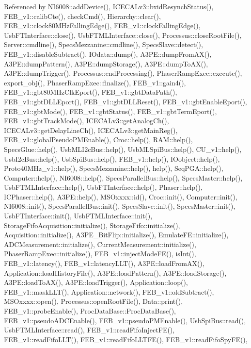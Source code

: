 Referenced by N\+I6008\+::add\+Device(), I\+C\+E\+C\+A\+Lv3\+::bxid\+Resynch\+Status(), F\+E\+B\+\_\+v1\+::calib\+Cte(), check\+Cmd(), Hierarchy\+::clear(), F\+E\+B\+\_\+v1\+::clock80\+M\+Hz\+Falling\+Edge(), F\+E\+B\+\_\+v1\+::clock\+Falling\+Edge(), Usb\+F\+T\+Interface\+::close(), Usb\+F\+T\+M\+L\+Interface\+::close(), Processus\+::close\+Root\+File(), Server\+::cmdline(), Specs\+Mezzanine\+::cmdline(), Specs\+Slave\+::detect(), F\+E\+B\+\_\+v1\+::disable\+Subtract(), I\+Odata\+::dump(), A3\+P\+E\+::dump\+From\+A\+X(), A3\+P\+E\+::dump\+Pattern(), A3\+P\+E\+::dump\+Storage(), A3\+P\+E\+::dump\+To\+A\+X(), A3\+P\+E\+::dump\+Trigger(), Processus\+::end\+Processing(), Phaser\+Ramp\+Exec\+::execute(), export\+\_\+obj(), Phaser\+Ramp\+Exec\+::finalize(), F\+E\+B\+\_\+v1\+::gain4(), F\+E\+B\+\_\+v1\+::gbt80\+M\+Hz\+Clk\+Eport(), F\+E\+B\+\_\+v1\+::gbt\+Data\+Path(), F\+E\+B\+\_\+v1\+::gbt\+D\+L\+L\+Eport(), F\+E\+B\+\_\+v1\+::gbt\+D\+L\+L\+Reset(), F\+E\+B\+\_\+v1\+::gbt\+Enable\+Eport(), F\+E\+B\+\_\+v1\+::gbt\+Mode(), F\+E\+B\+\_\+v1\+::gbt\+Status(), F\+E\+B\+\_\+v1\+::gbt\+Term\+Eport(), F\+E\+B\+\_\+v1\+::gbt\+Track\+Mode(), I\+C\+E\+C\+A\+Lv3\+::get\+Analog\+Ch(), I\+C\+E\+C\+A\+Lv3\+::get\+Delay\+Line\+Ch(), I\+C\+E\+C\+A\+Lv3\+::get\+Main\+Reg(), F\+E\+B\+\_\+v1\+::global\+Pseudo\+P\+M\+Enable(), Croc\+::help(), R\+A\+M\+::help(), Specs\+Glue\+::help(), Usb\+M\+L\+I2c\+Bus\+::help(), Usb\+M\+L\+Spi\+Bus\+::help(), C\+U\+\_\+v1\+::help(), Usb\+I2c\+Bus\+::help(), Usb\+Spi\+Bus\+::help(), F\+E\+B\+\_\+v1\+::help(), I\+Oobject\+::help(), Proto40\+M\+Hz\+\_\+v1\+::help(), Specs\+Mezzanine\+::help(), help(), Seq\+P\+G\+A\+::help(), Computer\+::help(), N\+I6008\+::help(), Specs\+Parallel\+Bus\+::help(), Specs\+Master\+::help(), Usb\+F\+T\+M\+L\+Interface\+::help(), Usb\+F\+T\+Interface\+::help(), Phaser\+::help(), I\+C\+Phaser\+::help(), A3\+P\+E\+::help(), M\+S\+Oxxxx\+::id(), Croc\+::init(), Computer\+::init(), N\+I6008\+::init(), Specs\+Parallel\+Bus\+::init(), Specs\+Slave\+::init(), Specs\+Master\+::init(), Usb\+F\+T\+Interface\+::init(), Usb\+F\+T\+M\+L\+Interface\+::init(), Storage\+Fifo\+Acquisition\+::initialize(), Storage\+Fifo\+::initialize(), Acquisition\+::initialize(), A3\+P\+E\+\_\+\+Bit\+Flip\+::initialize(), Emulate\+F\+E\+::initialize(), A\+D\+C\+Measurement\+::initialize(), Current\+Measurement\+::initialize(), Phaser\+Ramp\+Exec\+::initialize(), F\+E\+B\+\_\+v1\+::inject\+Mode\+F\+E(), is\+Int(), F\+E\+B\+\_\+v1\+::latency(), F\+E\+B\+\_\+v1\+::latency\+L\+L\+T(), A3\+P\+E\+::load\+From\+A\+X(), Application\+::load\+History\+File(), A3\+P\+E\+::load\+Pattern(), A3\+P\+E\+::load\+Storage(), A3\+P\+E\+::load\+To\+A\+X(), A3\+P\+E\+::load\+Trigger(), Application\+::loop(), F\+E\+B\+\_\+v1\+::mask\+L\+L\+T(), Application\+::network(), F\+E\+B\+\_\+v1\+::old\+Subtract(), M\+S\+Oxxxx\+::open(), Processus\+::open\+Root\+File(), Data\+::print(), F\+E\+B\+\_\+v1\+::probe\+Enable(), Proc\+Data\+Base\+::\+Proc\+Data\+Base(), F\+E\+B\+\_\+v1\+::pseudo\+A\+D\+C\+Enable(), F\+E\+B\+\_\+v1\+::pseudo\+P\+M\+Enable(), Usb\+Spi\+Bus\+::read(), Usb\+F\+T\+M\+L\+Interface\+::read(), F\+E\+B\+\_\+v1\+::read\+Fifo\+Inject\+F\+E(), F\+E\+B\+\_\+v1\+::read\+Fifo\+L\+L\+T(), F\+E\+B\+\_\+v1\+::read\+Fifo\+L\+L\+T\+F\+E(), F\+E\+B\+\_\+v1\+::read\+Fifo\+Spy\+F\+E(), 